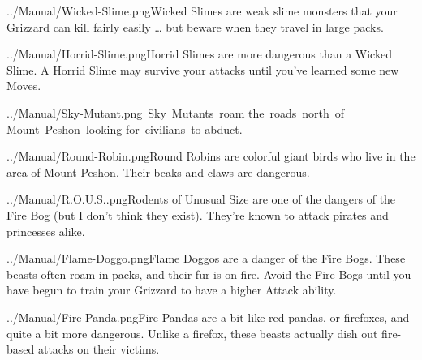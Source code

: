 \documentclass[9pt,twocolumn,openany,article]{memoir}
\newcommand\englishskip{\vspace{14pt}}
\begin{document}
{%
\englishskip

\lettrine[image=true,                lines=3,               findent=3pt,
nindent=3pt]{../Manual/Wicked-Slime.png}{}\noindent{}Wicked  Slimes  are
weak slime  monsters that  your Grizzard  can kill  fairly easily  … but
beware when they travel in large packs.

\englishskip

\lettrine[image=true,                lines=3,               findent=3pt,
nindent=3pt]{../Manual/Horrid-Slime.png}{}\noindent{}Horrid  Slimes  are
more dangerous  than a  Wicked Slime.  A Horrid  Slime may  survive your
attacks until you've learned some new Moves.

\englishskip

\lettrine[image=true,                lines=3,               findent=3pt,
nindent=3pt]{../Manual/Sky-Mutant.png}{}\noindent{}~Sky~Mutants~roam
the~roads~north~of Mount~Peshon~looking for~civilians~to abduct.

\englishskip

\lettrine[image=true,                lines=3,               findent=3pt,
nindent=3pt]{../Manual/Round-Robin.png}{}\noindent{}Round   Robins   are
colorful giant birds  who live in the area of  Mount Peshon. Their beaks
and claws are dangerous.

\englishskip

\lettrine[image=true,                lines=3,               findent=3pt,
nindent=3pt]{../Manual/R.O.U.S..png}{}\noindent{}Rodents of Unusual Size
are one of the  dangers of the Fire Bog (but I  don't think they exist).
They're known to attack pirates and princesses alike.

\englishskip

\lettrine[image=true,                lines=3,               findent=3pt,
nindent=3pt]{../Manual/Flame-Doggo.png}{}\noindent{}Flame   Doggos   are
a danger of the  Fire Bogs. These beasts often roam  in packs, and their
fur is on fire.  Avoid the Fire Bogs until you have  begun to train your
Grizzard to have a higher Attack ability.

\englishskip

\lettrine[image=true,                lines=3,               findent=3pt,
nindent=3pt]{../Manual/Fire-Panda.png}{}\noindent{}Fire Pandas are a bit
like  red  pandas,  or  firefoxes,  and  quite  a  bit  more  dangerous.
Unlike a firefox,  these beasts actually dish out  fire-based attacks on
their victims.

\englishskip

}
\end{document}

